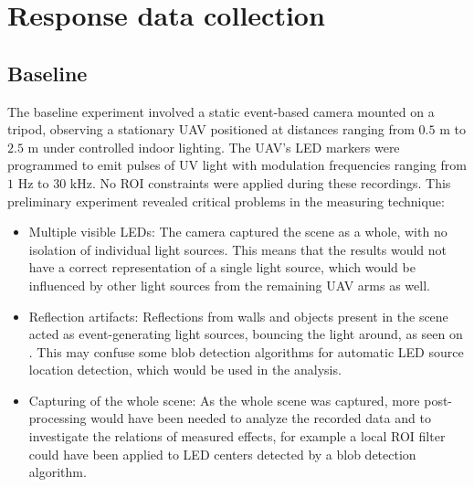 \section{Response data collection}

\subsection{Baseline}

The baseline experiment involved a static event-based camera mounted on a tripod, observing a stationary \ac{UAV} positioned at distances ranging from
$0.5$ m to $2.5$ m under controlled indoor lighting. The \ac{UAV}'s \ac{LED} markers were programmed to emit pulses of \ac{UV} light with modulation
frequencies ranging from $1$ Hz to $30$ kHz. No \ac{ROI} constraints were applied during these recordings.
This preliminary experiment revealed critical problems in the measuring technique:
\begin{itemize}
    \item Multiple visible \ac{LED}s: The camera captured the scene as a whole, with no isolation of individual light sources. This means that the results
    would not have a correct representation of a single light source, which would be influenced by other light sources from the remaining \ac{UAV}
    arms as well.
    \item Reflection artifacts: Reflections from walls and objects present in the scene acted as event-generating light sources, bouncing the light around,
    as seen on .
    This may confuse some blob detection algorithms for automatic \ac{LED} source location detection, which would be used in the analysis.
    \item Capturing of the whole scene: As the whole scene was captured, more post-processing would have been needed to analyze the recorded data and to investigate the relations of measured effects, for example a local \ac{ROI} filter could have been applied to \ac{LED} centers detected by a blob detection algorithm.
\end{itemize}



